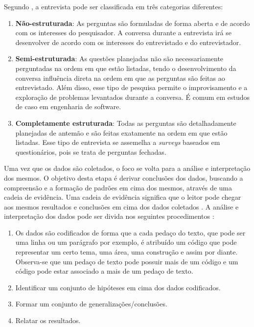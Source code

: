 Segundo \cite{caseStudySE}, a entrevista pode ser classificada em três categorias diferentes:
\begin{enumerate}
\item \textbf{Não-estruturada}: As perguntas são formuladas de forma aberta e de acordo com os interesses do pesquisador. A conversa durante a entrevista irá se desenvolver de acordo com os interesses do entrevistado e do entrevistador.
\item \textbf{Semi-estruturada}: As questões planejadas não são necessariamente perguntadas na ordem em que estão listadas, tendo o desenvolvimento da conversa influência direta na ordem em que as perguntas são feitas ao entrevistado. Além disso, esse tipo de pesquisa permite o improvisamento e a exploração de problemas levantados durante a conversa. É comum em estudos de caso em engenharia de software.
\item \textbf{Completamente estruturada}: Todas as perguntas são detalhadamente planejadas de antemão e são feitas exatamente na ordem em que estão listadas. Esse tipo de entrevista se assemelha a \textit{surveys} baseados em questionários, pois se trata de perguntas fechadas.
\end{enumerate}
	
Uma vez que os dados são coletados, o foco se volta para a análise e interpretação dos mesmos. O objetivo desta etapa é derivar conclusões dos dados, buscando a compreensão e a formação de padrões em cima dos mesmos, através de uma cadeia de evidência. Uma cadeia de evidência significa que o leitor pode chegar aos mesmos resultados e conclusões em cima dos dados coletados \cite{caseStudySE}. A análise e interpretação dos dados pode ser divida nos seguintes procedimentos \cite{caseStudySE}:

\begin{enumerate}
\item Os dados são codificados de forma que a cada pedaço do texto, que pode ser uma linha ou um parágrafo por exemplo, é atribuído um código que pode representar um certo tema, uma área, uma construção e assim por diante. Observa-se que um pedaço de texto pode possuir mais de um código e um código pode estar associado a mais de um pedaço de texto.
\item Identificar um conjunto de hipóteses em cima dos dados codificados.
\item Formar um conjunto de generalizações/conclusões.
\item Relatar os resultados.
\end{enumerate}

